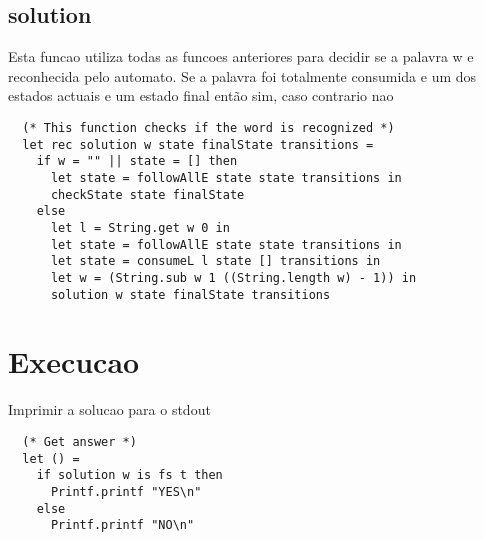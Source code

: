 \documentclass[11pt]{article}
\begin{document}
\subsection{solution}
\label{sec:org1ded6a5}
Esta funcao utiliza todas as funcoes anteriores para decidir se a palavra w e reconhecida pelo automato.
Se a palavra foi totalmente consumida e um dos estados actuais e um estado final então sim, caso contrario nao
\begin{verbatim}
  (* This function checks if the word is recognized *)
  let rec solution w state finalState transitions =
    if w = "" || state = [] then
      let state = followAllE state state transitions in
      checkState state finalState
    else
      let l = String.get w 0 in
      let state = followAllE state state transitions in
      let state = consumeL l state [] transitions in
      let w = (String.sub w 1 ((String.length w) - 1)) in
      solution w state finalState transitions
\end{verbatim}
\section{Execucao}
\label{sec:org47991a5}
Imprimir a solucao para o stdout
\begin{verbatim}
  (* Get answer *)
  let () =
    if solution w is fs t then
      Printf.printf "YES\n"
    else
      Printf.printf "NO\n"
\end{verbatim}
\end{document}
